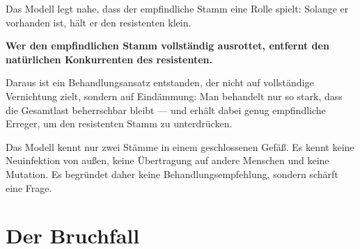 \begin{warnung}
Das Modell legt nahe, dass der empfindliche Stamm eine  Rolle spielt: Solange er vorhanden ist, hält er den resistenten klein.

\begin{center}
\begin{minipage}{0.9\textwidth}
\textbf{Wer den empfindlichen Stamm vollständig ausrottet, entfernt den natürlichen Konkurrenten des resistenten.}
\end{minipage}
\end{center}

Daraus ist ein Behandlungsansatz entstanden, der nicht auf vollständige Vernichtung zielt, sondern auf Eindämmung: Man behandelt nur so stark, dass die Gesamtlast beherrschbar bleibt --- und erhält dabei genug empfindliche Erreger, um den resistenten Stamm zu unterdrücken.

\begin{center}
\begin{minipage}{0.88\textwidth}
\end{minipage}
\end{center}

Das Modell kennt nur zwei Stämme in einem geschlossenen Gefäß. Es kennt keine Neuinfektion von außen, keine Übertragung auf andere Menschen und keine Mutation. Es begründet daher keine Behandlungsempfehlung, sondern schärft eine Frage.
\end{warnung}

\section{Der Bruchfall}


